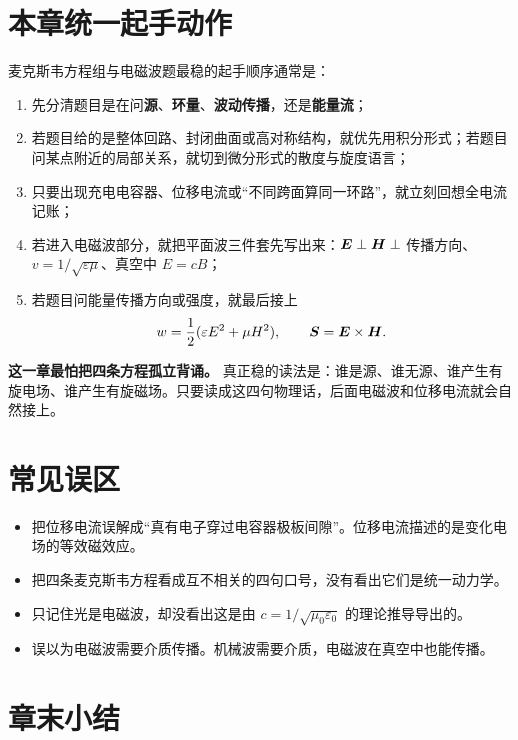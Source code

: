 \documentclass[lang=cn,11pt]{elegantbook}
\begin{document}
\section{本章统一起手动作}

麦克斯韦方程组与电磁波题最稳的起手顺序通常是：
\begin{enumerate}
  \item 先分清题目是在问\textbf{源}、\textbf{环量}、\textbf{波动传播}，还是\textbf{能量流}；
  \item 若题目给的是整体回路、封闭曲面或高对称结构，就优先用积分形式；若题目问某点附近的局部关系，就切到微分形式的散度与旋度语言；
  \item 只要出现充电电容器、位移电流或“不同跨面算同一环路”，就立刻回想全电流记账；
  \item 若进入电磁波部分，就把平面波三件套先写出来：\(\vb*{E}\perp \vb*{H}\perp\) 传播方向、\(v=1/\sqrt{\varepsilon\mu}\)、真空中 \(E=cB\)；
  \item 若题目问能量传播方向或强度，就最后接上
  \[
  w=\frac12(\varepsilon E^2+\mu H^2),
  \qquad
  \vb*{S}=\vb*{E}\times\vb*{H}.
  \]
\end{enumerate}

\begin{note}
\textbf{这一章最怕把四条方程孤立背诵。} 真正稳的读法是：谁是源、谁无源、谁产生有旋电场、谁产生有旋磁场。只要读成这四句物理话，后面电磁波和位移电流就会自然接上。
\end{note}

\section{常见误区}

\begin{itemize}
  \item 把位移电流误解成“真有电子穿过电容器极板间隙”。位移电流描述的是变化电场的等效磁效应。
  \item 把四条麦克斯韦方程看成互不相关的四句口号，没有看出它们是统一动力学。
  \item 只记住光是电磁波，却没看出这是由 \(c=1/\sqrt{\mu_0\varepsilon_0}\) 的理论推导导出的。
  \item 误以为电磁波需要介质传播。机械波需要介质，电磁波在真空中也能传播。
\end{itemize}

\section{章末小结}
\end{document}
